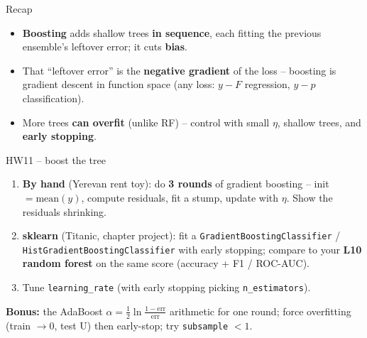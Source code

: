 \documentclass[aspectratio=169]{beamer}
\begin{document}
\begin{frame}{Recap}
  \begin{itemize}\small
    \item \textbf{Boosting} adds shallow trees \textbf{in sequence}, each fitting the
      previous ensemble's leftover error; it cuts \textbf{bias}.
    \item That ``leftover error'' is the \textbf{negative gradient} of the loss -- boosting
      is gradient descent in function space (any loss: $y - F$ regression, $y - p$
      classification).
    \item More trees \textbf{can overfit} (unlike RF) -- control with small $\eta$,
      shallow trees, and \textbf{early stopping}.
  \end{itemize}
  \vfill
\end{frame}

\begin{frame}{HW11 -- boost the tree}
  \begin{enumerate}\small
    \item \textbf{By hand} (Yerevan rent toy): do \textbf{3 rounds} of gradient boosting --
      init $= \text{mean}(y)$, compute residuals, fit a stump, update with $\eta$. Show the
      residuals shrinking.
    \item \textbf{sklearn} (Titanic, chapter project): fit a
      \texttt{GradientBoostingClassifier} / \texttt{HistGradientBoostingClassifier} with
      early stopping; compare to your \textbf{L10 random forest} on the same score
      (accuracy + F1 / ROC-AUC).
    \item Tune \texttt{learning\_rate} (with early stopping picking \texttt{n\_estimators}).
  \end{enumerate}
  \vskip 2pt
  \textbf{Bonus:} the AdaBoost $\alpha = \tfrac12\ln\frac{1-\text{err}}{\text{err}}$
  arithmetic for one round; force overfitting (train $\to 0$, test U) then early-stop; try
  \texttt{subsample} $< 1$.
\end{frame}
\end{document}
